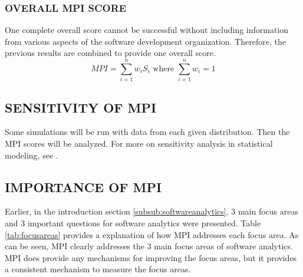 \documentclass[SDSUThesis.tex]{subfiles}
\begin{document}
        \subsubsection{OVERALL MPI SCORE}
            One complete overall score cannot be successful without including 
            information from various aspects of the software development 
            organization.  Therefore, the previous results
            are combined to provide one overall score.
            \[
                MPI =\sum\limits^n_{i=1} w_i S_i \text{ where } \sum\limits^n_{i=1} w_i = 1
            \]


    \subsection{SENSITIVITY OF MPI}
    \label{sub:sensitivity}
        
        Some simulations will be run with data from each given distribution.  Then the MPI scores
        will be analyzed.
        For more on sensitivity analysis in statistical modeling, see \cite{Saltelli2000}.

    \subsection{IMPORTANCE OF MPI}
    
        Earlier, in the introduction section \ref{subsub:softwareanalytics}, 3 main focus 
        areas and 3 important questions for software
        analytics were presented.  Table \ref{tab:focusareas} provides a explanation of how MPI addresses
        each focus area.  
        As can be seen, MPI clearly addresses the 3 main focus areas of software analytics.  MPI does provide
        any mechanisms for improving the focus areas, but it provides a consistent mechanism to measure
        the focus areas. 
        
\end{document}
